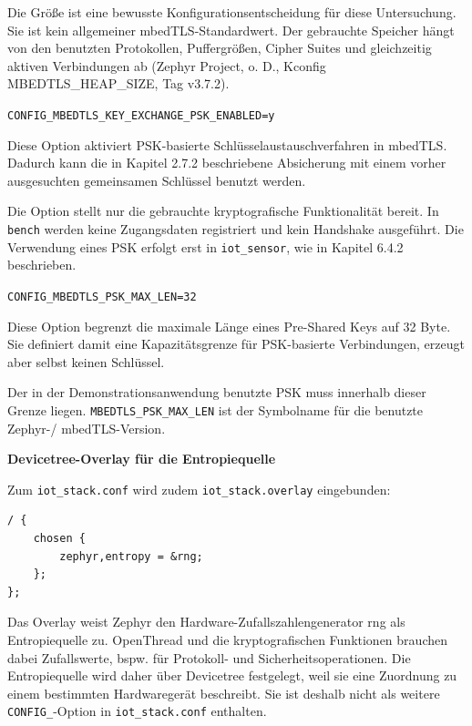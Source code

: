 Die Gr{\"o}{\ss}e ist eine bewusste Konfigurationsentscheidung f{\"u}r diese Untersuchung. Sie ist kein allgemeiner mbedTLS-Standardwert. Der gebrauchte Speicher h{\"a}ngt von den benutzten Protokollen, Puffergr{\"o}{\ss}en, Cipher Suites und gleichzeitig aktiven Verbindungen ab (Zephyr Project, o. D., Kconfig MBEDTLS\_HEAP\_SIZE, Tag v3.7.2).

\lstinline[style=fileinline]|CONFIG_MBEDTLS_KEY_EXCHANGE_PSK_ENABLED=y|

Diese Option aktiviert PSK-basierte Schl{\"u}sselaustauschverfahren in mbedTLS. Dadurch kann die in Kapitel 2.7.2 beschriebene Absicherung mit einem vorher ausgesuchten gemeinsamen Schl{\"u}ssel benutzt werden.

Die Option stellt nur die gebrauchte kryptografische Funktionalit{\"a}t bereit. In \lstinline[style=fileinline]|bench| werden keine Zugangsdaten registriert und kein Handshake ausgef{\"u}hrt. Die Verwendung eines PSK erfolgt erst in \lstinline[style=fileinline]|iot_sensor|, wie in Kapitel 6.4.2 beschrieben.

\lstinline[style=fileinline]|CONFIG_MBEDTLS_PSK_MAX_LEN=32|

Diese Option begrenzt die maximale L{\"a}nge eines Pre-Shared Keys auf 32 Byte. Sie definiert damit eine Kapazit{\"a}tsgrenze f{\"u}r PSK-basierte Verbindungen, erzeugt aber selbst keinen Schl{\"u}ssel.

Der in der Demonstrationsanwendung benutzte PSK muss innerhalb dieser Grenze liegen. \lstinline[style=fileinline]|MBEDTLS_PSK_MAX_LEN| ist der Symbolname f{\"u}r die benutzte Zephyr-/ mbedTLS-Version.

\textbf{Devicetree-Overlay f{\"u}r die Entropiequelle}

Zum \lstinline[style=fileinline]|iot_stack.conf| wird zudem \lstinline[style=fileinline]|iot_stack.overlay| eingebunden:

\begin{lstlisting}[style=basecode,language=DTS]
/ {
    chosen {
        zephyr,entropy = &rng;
    };
};
\end{lstlisting}
Das Overlay weist Zephyr den Hardware-Zufallszahlengenerator rng als Entropiequelle zu. OpenThread und die kryptografischen Funktionen brauchen dabei Zufallswerte, bspw. f{\"u}r Protokoll- und Sicherheitsoperationen. Die Entropiequelle wird daher {\"u}ber Devicetree festgelegt, weil sie eine Zuordnung zu einem bestimmten Hardwareger{\"a}t beschreibt. Sie ist deshalb nicht als weitere \lstinline[style=fileinline]|CONFIG_|-Option in \lstinline[style=fileinline]|iot_stack.conf| enthalten.

